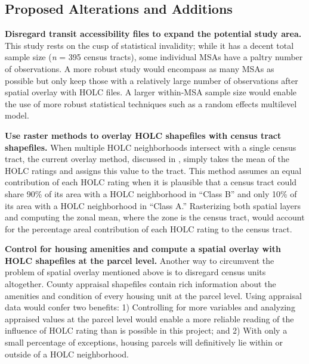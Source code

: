 \documentclass[paper=letter, fontsize=12pt]{scrartcl} %
\begin{document}
	\subsection{Proposed Alterations and Additions}
	\textbf{Disregard transit accessibility files to expand the potential study area.} This study rests on the cusp of statistical invalidity; while it has a decent total sample size (\textit{n} = 395 census tracts), some individual MSAs have a paltry number of observations. A more robust study would encompass as many MSAs as possible but only keep those with a relatively large number of observations after spatial overlay with HOLC files. A larger within-MSA sample size would enable the use of more robust statistical techniques such as a random effects multilevel model.\par
	\textbf{Use raster methods to overlay HOLC shapefiles with census tract shapefiles.} When multiple HOLC neighborhoods intersect with a single census tract, the current overlay method, discussed in , simply takes the mean of the HOLC ratings and assigns this value to the tract. This method assumes an equal contribution of each HOLC rating when it is plausible that a census tract could share 90\% of its area with a HOLC neighborhood in ``Class B'' and only 10\% of its area with a HOLC neighborhood in ``Class A.'' Rasterizing both spatial layers and computing the zonal mean, where the zone is the census tract, would account for the percentage areal contribution of each HOLC rating to the census tract. \par
	\textbf{Control for housing amenities and compute a spatial overlay with HOLC shapefiles at the parcel level.} Another way to circumvent the problem of spatial overlay mentioned above is to disregard census units altogether. County appraisal shapefiles contain rich information about the amenities and condition of every housing unit at the parcel level. Using appraisal data would confer two benefits: 1) Controlling for more variables and analyzing appraised values at the parcel level would enable a more reliable reading of the influence of HOLC rating than is possible in this project; and 2) With only a small percentage of exceptions, housing parcels will definitively lie within or outside of a HOLC neighborhood.
	
	
\end{document}
